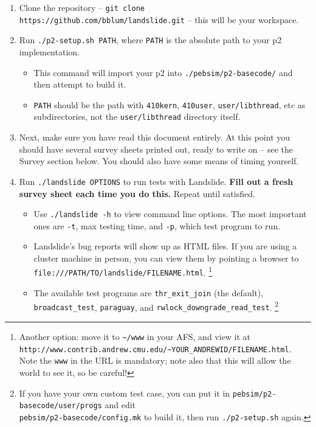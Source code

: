 \documentclass{article}
\begin{document}
\begin{enumerate}
	\item Clone the repository -- {\tt git clone https://github.com/bblum/landslide.git} -- this will be your workspace.
	\item Run {\tt ./p2-setup.sh PATH}, where {\tt PATH} is the absolute path to your p2 implementation.
		\begin{itemize}
			\item This command will import your p2 into {\tt ./pebsim/p2-basecode/} and then attempt to build it.
			\item {\tt PATH} should be the path with {\tt 410kern}, {\tt 410user}, {\tt user/libthread}, etc as subdirectories, not the {\tt user/libthread} directory itself.
		\end{itemize}
	\item Next, make sure you have read this document entirely. At this point you should have several survey sheets printed out, ready to write on -- see the Survey section below. You should also have some means of timing yourself.
	\item Run {\tt ./landslide OPTIONS} to run tests with Landslide. {\bf Fill out a fresh survey sheet each time you do this.} Repeat until satisfied.
		\begin{itemize}
			\item Use {\tt ./landslide -h} to view command line options. The most important ones are {\tt -t}, max testing time, and {\tt -p}, which test program to run.
			\item Landslide's bug reports will show up as HTML files. If you are using a cluster machine in person, you can view them by pointing a browser to {\tt file:///PATH/TO/landslide/FILENAME.html}.
				\footnote{Another option: move it to {\tt \textasciitilde/www} in your AFS, and view it at {\tt http://www.contrib.andrew.cmu.edu/\textasciitilde{}YOUR\_ANDREWID/FILENAME.html}. Note the {\tt www} in the URL is mandatory; note also that this will allow the world to see it, so be careful!}
			\item The available test programs are {\tt thr\_exit\_join} (the default), {\tt broadcast\_test}, {\tt paraguay}, and {\tt rwlock\_downgrade\_read\_test}.
				\footnote{If you have your own custom test case, you can put it in {\tt pebsim/p2-basecode/user/progs} and edit \\ {\tt pebsim/p2-basecode/config.mk} to build it, then run {\tt ./p2-setup.sh} again.}
		\end{itemize}
\end{enumerate}
\end{document}
